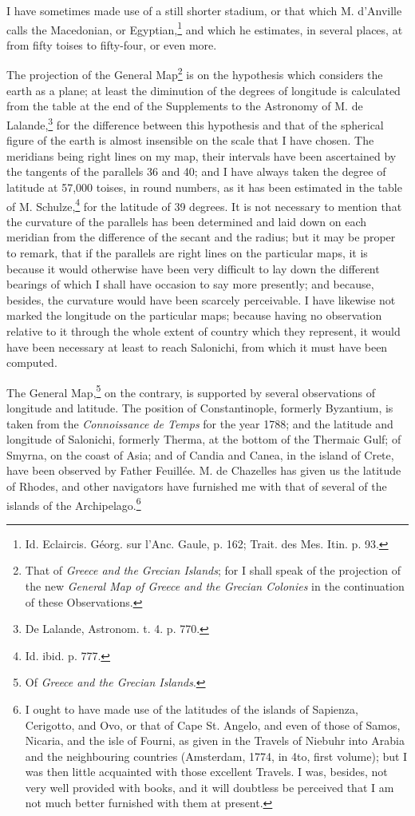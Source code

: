 \documentclass[a4paper, 11pt, oneside, polutonikogreek, english]{article}
\begin{document}
I have sometimes made use of a still shorter stadium, or that which M. d'Anville calls the Macedonian, or Egyptian,\footnote{Id. Eclaircis. Géorg. sur l'Anc. Gaule, p. 162; Trait. des Mes. Itin. p. 93.} and which he estimates, in several places, at from fifty toises to fifty-four, or even more.

The projection of the General Map\footnote{That of \emph{Greece and the Grecian Islands}; for I shall speak of the projection of the new \emph{General Map of Greece and the Grecian Colonies} in the continuation of these Observations.} is on the hypothesis which considers the earth as a plane; at least the diminution of the degrees of longitude is calculated from the table at the end of the Supplements to the Astronomy of M. de Lalande,\footnote{De Lalande, Astronom. t. 4. p. 770.} for the difference between this hypothesis and that of the spherical figure of the earth is almost insensible on the scale that I have chosen. The meridians being right lines on my map, their intervals have been ascertained by the tangents of the parallels 36 and 40; and I have always taken the degree of latitude at 57,000 toises, in round numbers, as it has been estimated in the table of M. Schulze,\footnote{Id. ibid. p. 777.} for the latitude of 39 degrees. It is not necessary to mention that the curvature of the parallels has been determined and laid down on each meridian from the difference of the secant and the radius; but it may be proper to remark, that if the parallels are right lines on the particular maps, it is because it would otherwise have been very difficult to lay down the different bearings of which I shall have occasion to say more presently; and because, besides, the curvature would have been scarcely perceivable. I have likewise not marked the longitude on the particular maps; because having no observation relative to it through the whole extent of country which they represent, it would have been necessary at least to reach Salonichi, from which it must have been computed.

The General Map,\footnote{Of \emph{Greece and the Grecian Islands}.} on the contrary, is supported by several observations of longitude and latitude. The position of Constantinople, formerly Byzantium, is taken from the \emph{Connoissance de Temps} for the year 1788; and the latitude and longitude of Salonichi, formerly Therma, at the bottom of the Thermaic Gulf; of Smyrna, on the coast of Asia; and of Candia and Canea, in the island of Crete, have been observed by Father Feuillée. M. de Chazelles has given us the latitude of Rhodes, and other navigators have furnished me with that of several of the islands of the Archipelago.\footnote{I ought to have made use of the latitudes of the islands of Sapienza, Cerigotto, and Ovo, or that of Cape St. Angelo, and even of those of Samos, Nicaria, and the isle of Fourni, as given in the Travels of Niebuhr into Arabia and the neighbouring countries (Amsterdam, 1774, in 4to, first volume); but I was then little acquainted with those excellent Travels. I was, besides, not very well provided with books, and it will doubtless be perceived that I am not much better furnished with them at present.}
\end{document}
